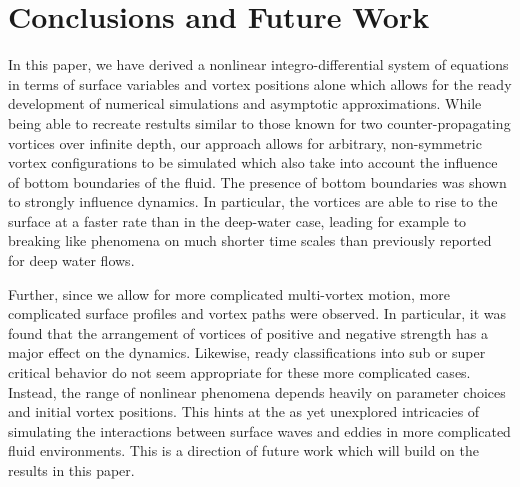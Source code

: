 \documentclass[a4paper,11pt]{article}
\begin{document}
\section{Conclusions and Future Work}
In this paper, we have derived a nonlinear integro-differential system of equations in terms of surface variables and vortex positions alone which allows for the ready development of numerical simulations and asymptotic approximations.  While being able to recreate restults similar to those known for two counter-propagating vortices over infinite depth, our approach allows for arbitrary, non-symmetric vortex configurations to be simulated which also take into account the influence of bottom boundaries of the fluid. The presence of bottom boundaries was shown to strongly influence dynamics.  In particular, the vortices are able to rise to the surface at a faster rate than in the deep-water case, leading for example to breaking like phenomena on much shorter time scales than previously reported for deep water flows.  

Further, since we allow for more complicated multi-vortex motion, more complicated surface profiles and vortex paths were observed. In particular, it was found that the arrangement of vortices of positive and negative strength has a major effect on the dynamics.  Likewise, ready classifications into sub or super critical behavior do not seem appropriate for these more complicated cases.  Instead, the range of nonlinear phenomena depends heavily on parameter choices and initial vortex positions.  This hints at the as yet unexplored intricacies of simulating the interactions between surface waves and eddies in more complicated fluid environments.  This is a direction of future work which will build on the results in this paper.        

\end{document}
